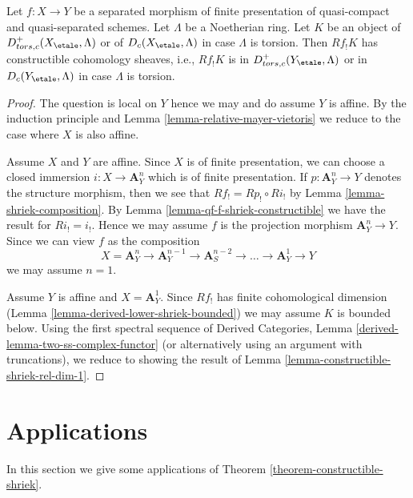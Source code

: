 \begin{theorem}
\label{theorem-constructible-shriek}
Let $f : X \to Y$ be a separated morphism of finite presentation
of quasi-compact and quasi-separated schemes. Let $\Lambda$ be a
Noetherian ring. Let $K$ be an object of $D^+_{tors, c}(X_\etale, \Lambda)$
or of $D_c(X_\etale, \Lambda)$ in case $\Lambda$ is torsion.
Then $Rf_!K$ has constructible cohomology sheaves, i.e.,
$Rf_!K$ is in $D^+_{tors, c}(Y_\etale, \Lambda)$
or in $D_c(Y_\etale, \Lambda)$ in case $\Lambda$ is torsion.
\end{theorem}

\begin{proof}
The question is local on $Y$ hence we may and do assume $Y$ is affine.
By the induction principle and Lemma \ref{lemma-relative-mayer-vietoris}
we reduce to the case where $X$ is also affine.

\medskip\noindent
Assume $X$ and $Y$ are affine. Since $X$ is of finite presentation,
we can choose a closed immersion $i : X \to \mathbf{A}^n_Y$ which is
of finite presentation. If $p : \mathbf{A}^n_Y \to Y$ denotes
the structure morphism, then we see that $Rf_! = Rp_! \circ Ri_!$
by Lemma \ref{lemma-shriek-composition}. By
Lemma \ref{lemma-qf-f-shriek-constructible}
we have the result for $Ri_! = i_!$. Hence we may assume $f$
is the projection morphism $\mathbf{A}^n_Y \to Y$.
Since we can view $f$ as the composition
$$
X = \mathbf{A}^n_Y \to \mathbf{A}^{n - 1}_Y \to
\mathbf{A}^{n - 2}_S \to \ldots \to
\mathbf{A}^1_Y \to Y
$$
we may assume $n = 1$.

\medskip\noindent
Assume $Y$ is affine and $X = \mathbf{A}^1_Y$. Since $Rf_!$ has
finite cohomological dimension
(Lemma \ref{lemma-derived-lower-shriek-bounded})
we may assume $K$ is bounded below. Using the first spectral sequence of
Derived Categories, Lemma \ref{derived-lemma-two-ss-complex-functor}
(or alternatively using an argument with truncations),
we reduce to showing the result of
Lemma \ref{lemma-constructible-shriek-rel-dim-1}.
\end{proof}








\section{Applications}
\label{section-applications}

\noindent
In this section we give some applications of
Theorem \ref{theorem-constructible-shriek}.


